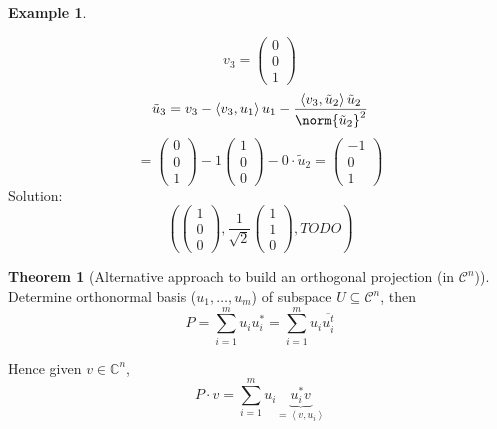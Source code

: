 \documentclass[a4paper,landscape,twocolumn]{article}
\newcommand\functional[1]{\left\langle{#1}\right\rangle}
\theoremstyle{definition}
\newtheorem{theorem}{Theorem}
\newtheorem{ex}{Example}
\DeclarePairedDelimiter\norm\lVert\rVert
\begin{document}
\begin{ex}
\begin{enumerate}
\[    \] \[
      v_3 = \begin{pmatrix} 0 \\ 0 \\ 1 \end{pmatrix}
    \] \[
      \tilde{u}_3 = v_3 - \functional{v_3, u_1} u_1 - \frac{\functional{v_3, \tilde{u}_2} \tilde{u}_2}{\norm{\tilde{u}_2}^2}
    \] \[
      = \begin{pmatrix} 0 \\ 0 \\ 1 \end{pmatrix} - 1 \begin{pmatrix} 1 \\ 0 \\ 0 \end{pmatrix} - 0 \cdot \tilde{u}_2 = \begin{pmatrix} -1 \\ 0 \\ 1 \end{pmatrix}
    \]
    Solution:
    \[
      \left(
        \begin{pmatrix} 1 \\ 0 \\ 0 \end{pmatrix},
        \frac{1}{\sqrt{2}} \begin{pmatrix} 1 \\ 1 \\ 0 \end{pmatrix},
        TODO
      \right)
    \]
  \end{enumerate}
\end{ex}

\begin{theorem}[Alternative approach to build an orthogonal projection (in $\mathcal C^n$)]
  \label{satz-8.59}
  Determine orthonormal basis ($u_1, \ldots, u_m$) of subspace $U \subseteq \mathcal C^n$, then
  \[ P = \sum_{i=1}^m u_i u_i^* = \sum_{i=1}^m u_i \overline{u_i^t} \]

  Hence given $v \in \mathbb C^n$,
  \[ P \cdot v = \sum_{i=1}^m u_i \underbrace{u_i^* v}_{= \functional{v, u_i}} \]
\end{theorem}
\end{document}
